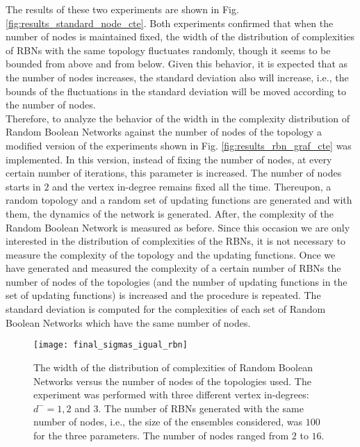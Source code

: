 The results of these two experiments are shown in Fig. \ref{fig:results_standard_node_cte}. Both experiments confirmed that when the number of nodes is maintained fixed, the width of the distribution of complexities of RBNs with the same topology fluctuates randomly, though it seems to be bounded from above and from below. Given this behavior, it is expected that as the number of nodes increases, the standard deviation also will increase, i.e., the bounds of the fluctuations in the standard deviation will be moved according to the number of nodes.\\

Therefore, to analyze the behavior of the width in the complexity distribution of Random Boolean Networks against the number of nodes of the topology a modified version of the experiments shown in Fig. \ref{fig:results_rbn_graf_cte} was implemented. In this version, instead of fixing the number of nodes, at every certain number of iterations, this parameter is increased. The number of nodes starts in $2$ and the vertex in-degree remains fixed all the time. Thereupon, a random topology and a random set of updating functions are generated and with them, the dynamics of the network is generated. After, the complexity of the Random Boolean Network is measured as before. Since this occasion we are only interested in the distribution of complexities of the RBNs, it is not necessary to measure the complexity of the topology and the updating functions. Once we have generated and measured the complexity of a certain number of RBNs the number of nodes of the topologies (and the number of updating functions in the set of updating functions) is increased and the procedure is repeated. The standard deviation is computed for the complexities of each set of Random Boolean Networks which have the same number of nodes.\\

\begin{figure}
\centering
\texttt{[image: final\_sigmas\_igual\_rbn]}
\caption[The width of the distribution of complexities of Random Boolean Networks versus the number of nodes of the topologies.]{The width of the distribution of complexities of Random Boolean Networks versus the number of nodes of the topologies used. The experiment was performed with three different vertex in-degrees: $d^{-}=1,2$ and $3$. The number of RBNs generated with the same number of nodes, i.e., the size of the ensembles considered, was $100$ for the three parameters. The number of nodes ranged from $2$ to $16$.}
\label{fig:final_sigmas_igual_rbn}
\end{figure}

